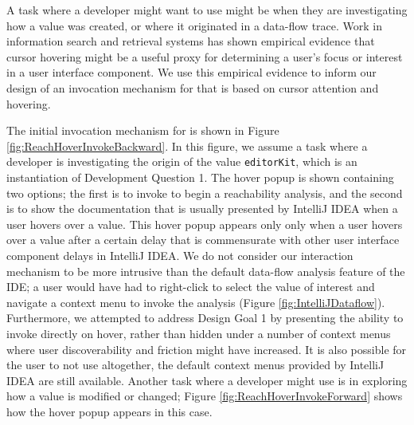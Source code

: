 \noindent A task where a developer might want to use \toolname{} might be when 
they are investigating how a value was created, or where it originated in a 
data-flow trace. 
Work in information search and retrieval systems
\cite{huang-2012-mouse,guo-2010-hover} has shown empirical evidence that cursor
hovering might be a useful proxy for determining a user's focus or interest in
a user interface component.
We use this empirical evidence to inform our design of an invocation mechanism 
for \toolname{} that is based on cursor attention and hovering.

\par The initial invocation mechanism for \toolname{} is shown in Figure 
\ref{fig:ReachHoverInvokeBackward}.
In this figure, we assume a task where a developer is investigating the origin
of the value \texttt{editorKit}, which is an instantiation of 
Development Question 1.
The hover popup is shown containing two options; the first is to invoke
\toolname{} to begin a reachability analysis, and the second is to show the
documentation that is usually presented by IntelliJ IDEA when a user hovers
over a value.
This hover popup appears only only when a user hovers over a value after a 
certain delay that is commensurate with other user interface component delays 
in IntelliJ IDEA.
We do not consider our interaction mechanism to be more intrusive than the
default data-flow analysis feature of the \ac{IDE};
a user would have had to right-click to select the value of interest and
navigate a context menu to invoke the analysis (Figure
\ref{fig:IntelliJDataflow}).
Furthermore, we attempted to address Design Goal 1 by presenting the ability to 
invoke \toolname{} directly on hover, rather than hidden under a number of 
context menus where user discoverability and friction might have increased.
It is also possible for the user to not use \toolname{} altogether, the default
context menus provided by IntelliJ IDEA are still available.
Another task where a developer might use \toolname{} is in exploring how a value
is modified or changed; Figure \ref{fig:ReachHoverInvokeForward} shows how
the hover popup appears in this case.

